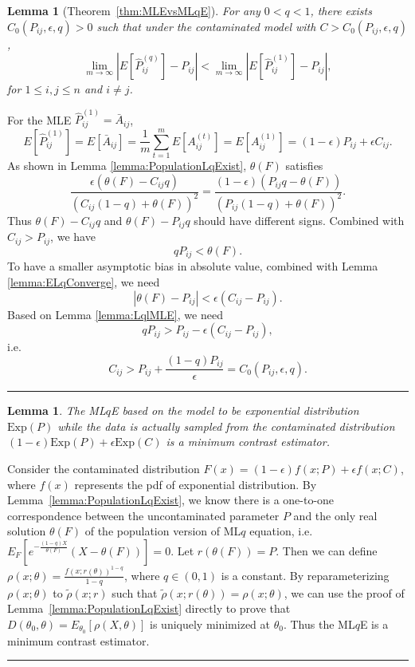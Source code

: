 \documentclass[a4paper]{article}
\newenvironment{proof}{{\bf Proof:  }}{\hfill\rule{2mm}{2mm}}
\newtheorem{lemma}[fact]{Lemma}
\renewcommand{\hat}{\widehat}
\begin{document}
\begin{lemma}[Theorem~\ref{thm:MLEvsMLqE}]
\label{lemma:ELqlEMLEproof}
For any $0 < q < 1$, there exists $C_0(P_{ij}, \epsilon, q) > 0$ such that under the contaminated model with $C > C_0(P_{ij}, \epsilon, q)$,
\[
	\lim_{m \to \infty} \left| E[\hat{P}^{(q)}_{ij}] - P_{ij} \right| < 
    \lim_{m \to \infty} \left| E[\hat{P}^{(1)}_{ij}] - P_{ij} \right|,
\]
for $1 \le i, j \le n$ and $i \ne j$.
\end{lemma}
\begin{proof}
For the MLE $\hat{P}^{(1)}_{ij} = \bar{A}_{ij}$,
\[
	E[\hat{P}^{(1)}_{ij}] = E[\bar{A}_{ij}]
    = \frac{1}{m} \sum_{t = 1}^m E[A_{ij}^{(t)}]
    = E[A_{ij}^{(1)}]
    = (1-\epsilon) P_{ij} + \epsilon C_{ij}.
\]
As shown in Lemma \ref{lemma:PopulationLqExist}, $\theta(F)$ satisfies
\[
\frac{\epsilon (\theta(F) - C_{ij}q)}{(C_{ij}(1-q) + \theta(F))^2} =
\frac{(1-\epsilon) (P_{ij} q - \theta(F))}{(P_{ij}(1-q) + \theta(F))^2}.
\]
Thus $\theta(F) - C_{ij} q$ and $\theta(F) - P_{ij} q$ should have different signs. Combined with $C_{ij} > P_{ij}$, we have
\[
q P_{ij} < \theta(F).
\]
To have a smaller asymptotic bias in absolute value, combined with Lemma \ref{lemma:ELqConverge}, we need
\[
|\theta(F) - P_{ij}| < \epsilon (C_{ij} - P_{ij}).
\]
Based on Lemma \ref{lemma:LqlMLE}, we need
\[
q P_{ij} > P_{ij} - \epsilon(C_{ij} - P_{ij}),
\]
i.e.
\[
C_{ij} > P_{ij} + \frac{(1-q) P_{ij}}{\epsilon} = C_0(P_{ij}, \epsilon, q).
\]
\end{proof}


\begin{lemma}
\label{lemma:minimumcontrast}
The ML$q$E based on the model to be exponential distribution $\mathrm{Exp}(P)$ while the data is actually sampled from the contaminated distribution $(1-\epsilon) \mathrm{Exp}(P) + \epsilon \mathrm{Exp}(C)$ is a minimum contrast estimator.
\end{lemma}
\begin{proof}
Consider the contaminated distribution $F(x) = (1-\epsilon) f(x; P) + \epsilon f(x; C)$, where $f(x)$ represents the pdf of exponential distribution. By Lemma~\ref{lemma:PopulationLqExist}, we know there is a one-to-one correspondence between the uncontaminated parameter $P$ and the only real solution $\theta(F)$ of the population version of ML$q$ equation,
i.e. $E_F[e^{-\frac{(1-q)X}{\theta(F)}}(X - \theta(F))] = 0$. Let $r(\theta(F)) = P$.
Then we can define $\rho(x; \theta) = \frac{f(x; r(\theta))^{1-q}}{1 - q}$, where $q \in (0, 1)$ is a constant.
By reparameterizing $\rho(x; \theta)$ to $\widetilde{\rho}(x; r)$ such that $\widetilde{\rho}(x; r(\theta)) = \rho(x; \theta)$, we can use the proof of Lemma~\ref{lemma:PopulationLqExist} directly to prove that $D(\theta_0, \theta) = E_{\theta_0}[\rho(X, \theta)]$ is uniquely minimized at $\theta_0$. Thus the ML$q$E is a minimum contrast estimator.
\end{proof}
\end{document}
